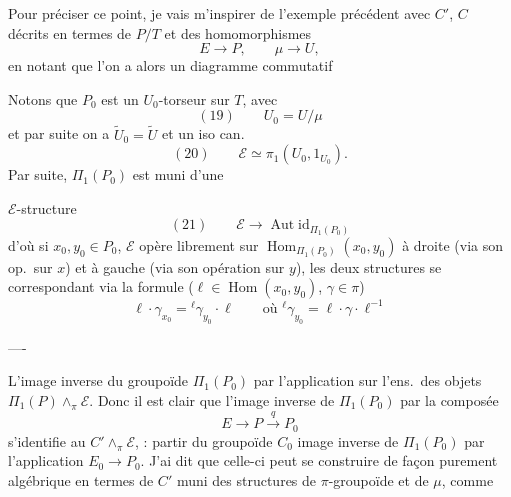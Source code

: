 \documentclass[11pt,a4paper]{article}
\begin{document}
Pour préciser ce point, je vais m'inspirer de l'exemple précédent avec $C'$, $C$ décrits en
termes de $P/T$ et des \struck{\ill{}}homomorphismes
\[
  E \longrightarrow P, \qquad \mu \longrightarrow U,
\]
en notant que l'on a alors un diagramme commutatif


Notons que  $P_0$ est un $U_0$-torseur sur $T$, avec
\[
  (19) \qquad U_0 = U/\mu
\]
et par suite on a $\widetilde{U}_0 = \widetilde{U}$ et un iso can.
\[
  (20) \qquad \mathcal{E} \simeq \pi_1(U_0, 1_{U_0}) .
\]
Par suite, \struck{\ill{}} $\Pi_1(P_0)$ est muni d'une


$\mathcal{E}$-structure
\[
  (21) \qquad \mathcal{E} \longrightarrow \operatorname{Aut} \mathrm{id}_{\Pi_1(P_0)}
\]
d'où si $x_0, y_0 \in P_0$, $\mathcal{E}$ opère librement sur
$\operatorname{Hom}_{\Pi_1(P_0)}(x_0, y_0)$ à droite (via son op.\ sur $x$) et à gauche (via
son opération sur $y$), les deux structures  se correspondant  via la \struck{\ill{}} formule ($\ell \in \operatorname{Hom}(x_0, y_0)$,
$\gamma \in \pi$)
\[
  \ell \cdot \gamma_{x_0} = {}^{\ell}\gamma_{y_0} \cdot \ell
  \qquad \text{où } {}^{\ell}\gamma_{y_0} = \ell \cdot \gamma \cdot \ell^{-1}
\]

----

 L'image inverse du groupoïde $\Pi_1(P_0)$ \struck{\ill{}} par
l'application  \struck{\ill{}} sur l'ens.\ des objets 
$\Pi_1(P) \wedge_\pi \mathcal{E}$. Donc il est clair que l'image inverse de $\Pi_1(P_0)$ par
la composée
\[
  E \longrightarrow P \xrightarrow{\;q\;} P_0
\]
 s'identifie au 
$C' \wedge_\pi \mathcal{E}$,  
\struck{\ill{}}  : partir du groupoïde $C_0$ image inverse de
$\Pi_1(P_0)$ par l'application $E_0 \to P_0$. J'ai dit que celle-ci peut se construire de
façon purement algébrique en termes de $C'$ muni des structures de $\pi$-groupoïde et de
 $\mu$,  
comme
\end{document}
